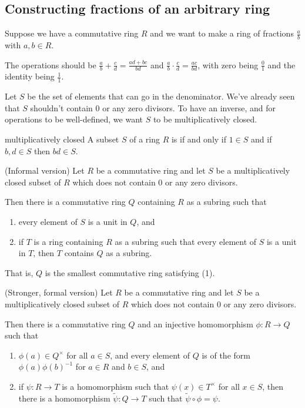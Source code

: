 \documentclass[12pt,letterpaper]{report}
\begin{document}
\pagebreak
\subsection{Constructing fractions of an arbitrary ring}

Suppose we have a commutative ring $R$ and we want to make a ring of fractions $\frac{a}{b}$ with
$a, b \in R$.

The operations should be $\frac{a}{b} + \frac{c}{d} = \frac{ad + bc}{bd}$ and
$\frac{a}{b} \cdot \frac{c}{d} = \frac{ac}{bd}$, with zero being $\frac{0}{1}$ and the identity
being $\frac{1}{1}$.

Let $S$ be the set of elements that can go in the denominator.
We've already seen that $S$ shouldn't contain 0 or any zero divisors.
To have an inverse, and for operations to be well-defined, we want $S$ to be multiplicatively
closed.

\begin{defn}{multiplicatively closed}{}
  A subset $S$ of a ring $R$ is  if and only if $1 \in S$ and
  if $b, d \in S$ then $bd \in S$.
\end{defn}

\begin{thm}{(Informal version)}{}
  Let $R$ be a commutative ring and let $S$ be a multiplicatively closed subset of $R$ which does
  not contain 0 or any zero divisors.

  Then there is a commutative ring $Q$ containing $R$ as a subring such that
  \begin{enumerate}
    \item every element of $S$ is a unit in $Q$, and
    \item if $T$ is a ring containing $R$ as a subring such that every element of $S$ is a unit in
      $T$, then $T$ contains $Q$ as a subring.
  \end{enumerate}
\end{thm}

That is, $Q$ is the smallest commutative ring satisfying (1).

\begin{thm}{(Stronger, formal version)}{}
  Let $R$ be a commutative ring and let $S$ be a multiplicatively closed subset of $R$ which does
  not contain 0 or any zero divisors.

  Then there is a commutative ring $Q$ and an injective homomorphism $\phi \colon R \to Q$ such that
  \begin{enumerate}
    \item $\phi(a) \in Q^\times$ for all $a \in S$, and every element of $Q$ is of the form
      $\phi(a)\phi(b)^{-1}$ for $a \in R$ and $b \in S$, and
    \item if $\psi \colon R \to T$ is a homomorphism such that $\psi(x) \in T^\times$ for all
      $x \in S$, then there is a homomorphism $\tilde{\psi} \colon Q \to T$ such that
      $\tilde{\psi} \circ \phi = \psi$.
  \end{enumerate}
\end{thm}
\end{document}
